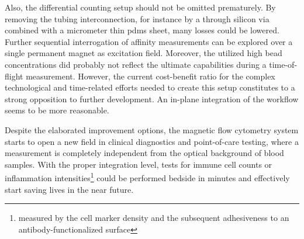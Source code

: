 Also, the differential counting setup should not be omitted prematurely. By removing the tubing interconnection, for instance by a through silicon via combined with a micrometer thin \gls{pdms} sheet, many losses could be lowered. Further sequential interrogation of affinity measurements can be explored over a single permanent magnet as excitation field. Moreover, the utilized high bead concentrations did probably not reflect the ultimate capabilities during a time-of-flight measurement. However, the current cost-benefit ratio for the complex technological and time-related efforts needed to create this setup constitutes to a strong opposition to further development. An in-plane integration of the workflow seems to be more reasonable.

Despite the elaborated improvement options, the magnetic flow cytometry system starts to open a new field in clinical diagnostics and point-of-care testing, where a measurement is completely independent from the optical background of blood samples. With the proper integration level, tests for immune cell counts or inflammation intensities\footnote{measured by the cell marker density and the subsequent adhesiveness to an antibody-functionalized surface} could be performed bedside in minutes and effectively start saving lives in the near future. 


